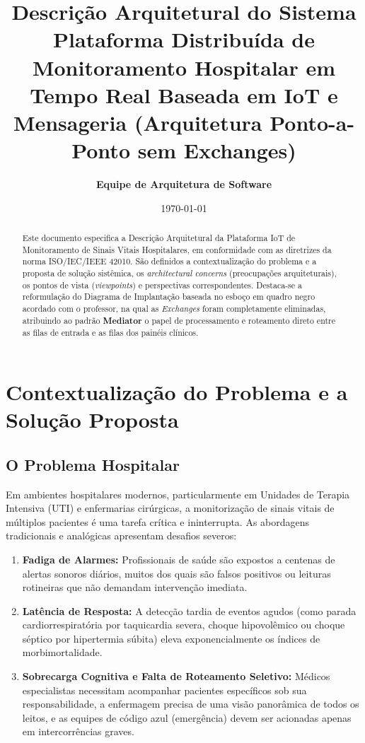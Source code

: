 \documentclass[12pt,a4paper]{article}
\title{\textbf{Descrição Arquitetural do Sistema}\\
\large Plataforma Distribuída de Monitoramento Hospitalar em Tempo Real Baseada em IoT e Mensageria (Arquitetura Ponto-a-Ponto sem Exchanges)}
\author{\textbf{Equipe de Arquitetura de Software}}
\date{\today}
\begin{document}
\maketitle

\begin{abstract}
Este documento especifica a Descrição Arquitetural da Plataforma IoT de Monitoramento de Sinais Vitais Hospitalares, em conformidade com as diretrizes da norma ISO/IEC/IEEE 42010. São definidos a contextualização do problema e a proposta de solução sistêmica, os \textit{architectural concerns} (preocupações arquiteturais), os pontos de vista (\textit{viewpoints}) e perspectivas correspondentes. Destaca-se a reformulação do Diagrama de Implantação baseada no esboço em quadro negro acordado com o professor, na qual as \textit{Exchanges} foram completamente eliminadas, atribuindo ao padrão \textbf{Mediator} o papel de processamento e roteamento direto entre as filas de entrada e as filas dos painéis clínicos.
\end{abstract}

\tableofcontents
\newpage

\section{Contextualização do Problema e a Solução Proposta}

\subsection{O Problema Hospitalar}
Em ambientes hospitalares modernos, particularmente em Unidades de Terapia Intensiva (UTI) e enfermarias cirúrgicas, a monitorização de sinais vitais de múltiplos pacientes é uma tarefa crítica e ininterrupta. As abordagens tradicionais e analógicas apresentam desafios severos:
\begin{enumerate}
    \item \textbf{Fadiga de Alarmes:} Profissionais de saúde são expostos a centenas de alertas sonoros diários, muitos dos quais são falsos positivos ou leituras rotineiras que não demandam intervenção imediata.
    \item \textbf{Latência de Resposta:} A detecção tardia de eventos agudos (como parada cardiorrespiratória por taquicardia severa, choque hipovolêmico ou choque séptico por hipertermia súbita) eleva exponencialmente os índices de morbimortalidade.
    \item \textbf{Sobrecarga Cognitiva e Falta de Roteamento Seletivo:} Médicos especialistas necessitam acompanhar pacientes específicos sob sua responsabilidade, a enfermagem precisa de uma visão panorâmica de todos os leitos, e as equipes de código azul (emergência) devem ser acionadas apenas em intercorrências graves.
\end{enumerate}
\end{document}
